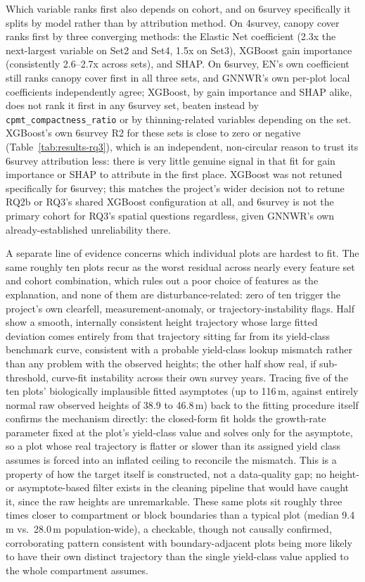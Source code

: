 \documentclass[11pt,a4paper]{report}
\begin{document}
Which variable ranks first also depends on cohort, and on 6survey specifically it
splits by model rather than by attribution method. On 4survey, canopy cover ranks
first by three converging methods: the Elastic Net coefficient (2.3x the next-largest
variable on Set2 and Set4, 1.5x on Set3), XGBoost gain importance (consistently
2.6--2.7x across sets), and SHAP. On 6survey, EN's own coefficient still ranks canopy
cover first in all three sets, and GNNWR's own per-plot local coefficients
independently agree; XGBoost, by gain importance and SHAP alike, does not rank it
first in any 6survey set, beaten instead by \texttt{cpmt\_compactness\_ratio} or by
thinning-related variables depending on the set. XGBoost's own 6survey R2 for these
sets is close to zero or negative (Table~\ref{tab:results-rq3}), which is an
independent, non-circular reason to trust its 6survey attribution less: there is very
little genuine signal in that fit for gain importance or SHAP to attribute in the
first place. XGBoost was not retuned specifically for 6survey; this matches the
project's wider decision not to retune RQ2b or RQ3's shared XGBoost configuration at
all, and 6survey is not the primary cohort for RQ3's spatial questions regardless,
given GNNWR's own already-established unreliability there.

A separate line of evidence concerns which individual plots are hardest to fit. The
same roughly ten plots recur as the worst residual across nearly every feature set and
cohort combination, which rules out a poor choice of features as the explanation, and
none of them are disturbance-related: zero of ten trigger the project's own
clearfell, measurement-anomaly, or trajectory-instability flags. Half show a smooth,
internally consistent height trajectory whose large fitted deviation comes entirely
from that trajectory sitting far from its yield-class benchmark curve, consistent with
a probable yield-class lookup mismatch rather than any problem with the observed
heights; the other half show real, if sub-threshold, curve-fit instability across
their own survey years. Tracing five of the ten plots' biologically implausible fitted
asymptotes (up to 116\,m, against entirely normal raw observed heights of 38.9 to
46.8\,m) back to the fitting procedure itself confirms the mechanism directly: the
closed-form fit holds the growth-rate parameter fixed at the plot's yield-class value
and solves only for the asymptote, so a plot whose real trajectory is flatter or
slower than its assigned yield class assumes is forced into an inflated ceiling to
reconcile the mismatch. This is a property of how the target itself is constructed,
not a data-quality gap; no height- or asymptote-based filter exists in the cleaning
pipeline that would have caught it, since the raw heights are unremarkable. These same
plots sit roughly three times closer to compartment or block boundaries than a typical
plot (median 9.4\,m vs.\ 28.0\,m population-wide), a checkable, though not causally
confirmed, corroborating pattern consistent with boundary-adjacent plots being more
likely to have their own distinct trajectory than the single yield-class value applied
to the whole compartment assumes.
\end{document}
